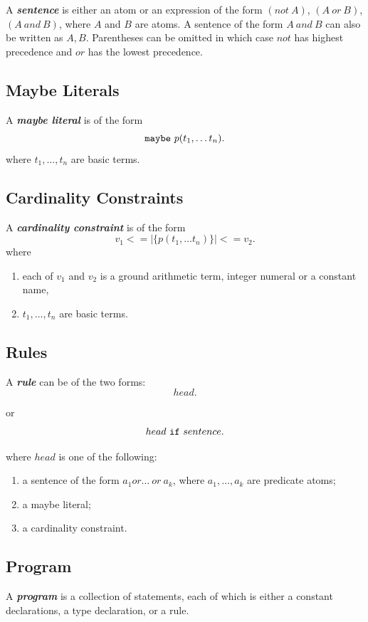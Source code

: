 \documentclass[a4paper,10pt]{article}
\begin{document}
A \textit{\textbf{sentence}} is either an atom or an expression of the form $(not~A)$, $(A~or~B)$, $(A~and~B)$, where $A$ and $B$ are atoms. A sentence of the form $A~and~B$
can also be written as $A, B$. Parentheses can be omitted in which case $not$ has highest precedence and $or$ has the lowest precedence. 

\subsection{Maybe Literals}

A \textbf{\textit{maybe literal}} is of the form $$\mbox{\texttt{maybe}}~p(t_1,\ldots t_n).$$ where $t_1,\ldots,t_n$ are basic terms.

\subsection{Cardinality Constraints}

A \textit{\textbf{cardinality constraint}} is of the form 
$$v_1 <= |\{p(t_1,\ldots t_n)\}| <= v_2.$$
where
\begin{enumerate}
\item each of $v_1$ and $v_2$ is a ground arithmetic term, integer numeral or a constant name, 
\item $t_1,\ldots,t_n$ are basic terms.
\end{enumerate}
\subsection{Rules} \label{rl}

A \textit{\textbf{rule}} can be of the two forms:
\begin{equation}\label{eq1}
  head. 
\end{equation}

\noindent
or 
\begin{equation}
head~\mbox{\texttt{if}}~sentence.
\end{equation}

\noindent
where $head$ is one of the following:
\begin{enumerate}
\item  a sentence of the form $a_1 or \ldots~ or ~a_k$, where $a_1,\ldots,a_k$ are predicate atoms;
\item  a maybe literal;
\item  a cardinality constraint.
\end{enumerate}

\subsection{Program} \label{progdef}
A \textbf{\textit{program}} is a collection of statements, each of which is either a constant declarations, a
 type declaration, or a rule.
\end{document}
